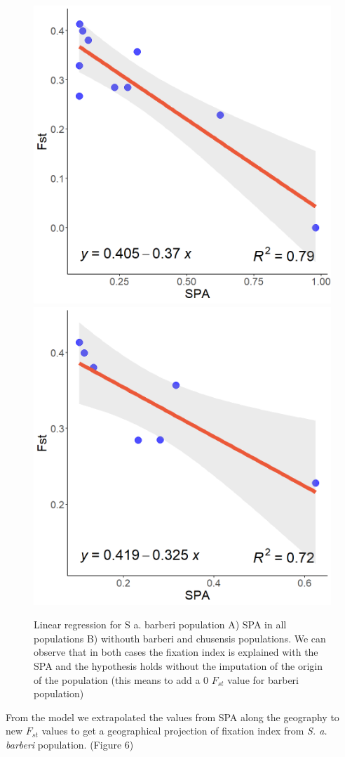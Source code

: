 \documentclass[
]{article}
\begin{document}
\begin{figure}
\includegraphics[width=0.5\linewidth]{all_figures/figure_5a} \includegraphics[width=0.5\linewidth]{all_figures/figure_5b} \caption{Linear regression for S a. barberi population A) SPA in all populations B) withouth barberi and chusensis populations. We can observe that in both cases the fixation index is explained with the SPA and the hypothesis holds without the imputation of the origin of the population (this means to add a 0 $F_{st}$ value for barberi population)}\label{fig:figures-side}
\end{figure}

From the model we extrapolated the values from SPA along the geography
to new \(F_{st}\) values to get a geographical projection of fixation
index from \emph{S. a. barberi} population. (Figure 6)
\end{document}
